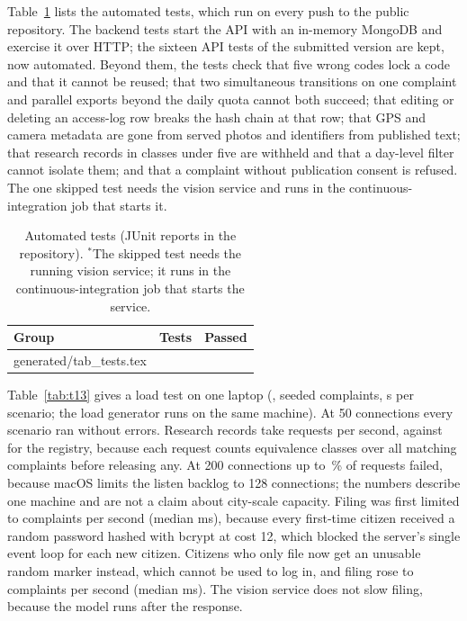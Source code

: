 \documentclass{ieeeaccess}
\makeatletter
\newcommand{\tablebody}[1]{\@@input #1 }
\makeatother
\begin{document}
Table~\ref{tab:t12} lists the automated tests, which run on every push to the public repository. The backend tests start the API with an in-memory MongoDB and exercise it over HTTP; the sixteen API tests of the submitted version are kept, now automated. Beyond them, the tests check that five wrong codes lock a code and that it cannot be reused; that two simultaneous transitions on one complaint and parallel exports beyond the daily quota cannot both succeed; that editing or deleting an access-log row breaks the hash chain at that row; that GPS and camera metadata are gone from served photos and identifiers from published text; that research records in classes under five are withheld and that a day-level filter cannot isolate them; and that a complaint without publication consent is refused. The one skipped test needs the vision service and runs in the continuous-integration job that starts it.

\begin{table}[!tb]
\caption{Automated tests (JUnit reports in the repository). $^{*}$The skipped test needs the running vision service; it runs in the continuous-integration job that starts the service.}
\label{tab:t12}
\centering
\footnotesize
\setlength{\tabcolsep}{3pt}
\begin{tabular}{@{}p{5.4cm}cc@{}}
\toprule
Group & Tests & Passed\\
\midrule
\tablebody{generated/tab_tests.tex}
\bottomrule
\end{tabular}
\end{table}

Table~\ref{tab:t13} gives a load test on one laptop (\nLoadCpu, \nLoadComplaints{} seeded complaints, \nLoadDuration{} s per scenario; the load generator runs on the same machine). At 50 connections every scenario ran without errors. Research records take \nLoadResearchRecordsFiveZerorps{} requests per second, against \nLoadRegistryListFiveZerorps{} for the registry, because each request counts equivalence classes over all matching complaints before releasing any. At 200 connections up to \nLoadRegistryListTwoZeroZeroerrors\,\% of requests failed, because macOS limits the listen backlog to 128 connections; the numbers describe one machine and are not a claim about city-scale capacity. Filing was first limited to \nLoadSubmitBeforeRps{} complaints per second (median \nLoadSubmitBeforePfifty{} ms), because every first-time citizen received a random password hashed with bcrypt at cost 12, which blocked the server's single event loop for each new citizen. Citizens who only file now get an unusable random marker instead, which cannot be used to log in, and filing rose to \nLoadSubmitTwoZerorps{} complaints per second (median \nLoadSubmitTwoZeropfifty{} ms). The vision service does not slow filing, because the model runs after the response.
\end{document}
